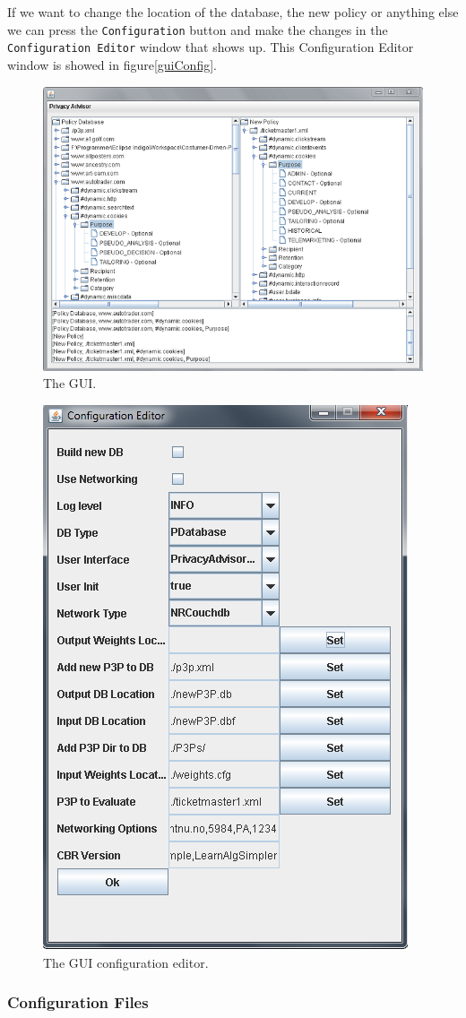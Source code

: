 
If we want to change the location of the database, the new policy or anything else we can press the \texttt{Configuration} button and make the changes in the \texttt{Configuration Editor} window that shows up. This Configuration Editor window is showed in figure\ref{guiConfig}.

 \begin{figure}
     \includegraphics[width = .48\textwidth]{Documentation/gui.png}
     \caption{The GUI.}
   \label{guiFigure}
 \end{figure}

   \begin{figure}
     \includegraphics[width = .48\textwidth]{Documentation/gui_config.png}
     \caption{The GUI configuration editor.}
   \label{guiFigure}
 \end{figure}


\subsubsection{Configuration Files}

